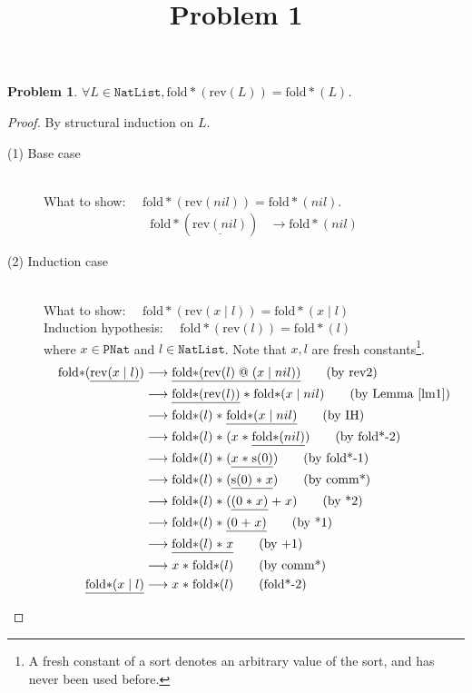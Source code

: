\documentclass[12pt, a4paper]{article}
\title{Problem 1}
\date{\vspace{-5ex}}
\newtheorem{problem}{Problem}
\newcommand{\rel}[1]{\mathrel{#1}}
\newcommand{\rmx}[1]{\mathrm{#1}}
\newcommand{\larrow}{\longrightarrow}
\newcommand{\under}{\underline}
\begin{document}
\maketitle

\begin{problem}
$\forall L \in \mathtt{NatList}, \rmx{fold*}(\rmx{rev}(L)) = \rmx{fold*}(L)$.
\end{problem}
\begin{proof}
By structural induction on $L$.

\begin{description}

\item[(1) Base case]~\\
\noindent
What to show: $\quad\rmx{fold*}(\rmx{rev}(nil)) = \rmx{fold*}(nil)$.
\begin{align*}
\rmx{fold*}(\under{\rmx{rev}(nil)}) &\larrow \rmx{fold*}(nil) \tag{by rev1}
\end{align*}

\item[(2) Induction case]~\\
What to show: $\quad\rmx{fold*}(\rmx{rev}(x \rel{|} l)) = \rmx{fold*}(x \rel{|} l)$\\
Induction hypothesis: $\quad\rmx{fold*}(\rmx{rev}(l)) = \rmx{fold*}(l)$\\
where $x \in \mathtt{PNat}$ and $l \in \mathtt{NatList}$. Note that $x, l$ are fresh constants\footnote{A fresh constant of a sort denotes an arbitrary value of the sort, and has never been used before.}.
\begin{align*}
\rmx{fold*}(\under{\rmx{rev}(x \rel{|} l)}) 
	&\larrow \under{\rmx{fold*}(\rmx{rev}(l)\rel{@}(x \rel{|} nil))} \tag{by rev2} \\
	&\larrow \under{\rmx{fold*}(\rmx{rev}(l))} \rel{*} \rmx{fold*}(x \rel{|} nil) \tag{by Lemma~\ref{lm1}} \\
	&\larrow \rmx{fold*}(l) \rel{*} \under{\rmx{fold*}(x \rel{|} nil)} \tag{by IH} \\
	&\larrow \rmx{fold*}(l) \rel{*} (x \rel{*} \under{\rmx{fold*}(nil)}) \tag{by fold*-2} \\
	&\larrow \rmx{fold*}(l) \rel{*} (\under{x \rel{*} \rmx{s}(0)}) \tag{by fold*-1} \\
	&\larrow \rmx{fold*}(l) \rel{*} (\under{\rmx{s}(0) \rel{*} x}) \tag{by comm*} \\
	&\larrow \rmx{fold*}(l) \rel{*} (\under{(0 \rel{*} x)} \rel{+} x) \tag{by *2} \\
	&\larrow \rmx{fold*}(l) \rel{*} \under{(0 \rel{+} x)} \tag{by *1} \\
	&\larrow \under{\rmx{fold*}(l) \rel{*} x} \tag{by +1} \\
	&\larrow x \rel{*} \rmx{fold*}(l) \tag{by comm*} \\
\under{\rmx{fold*}(x \rel{|} l)} 
	&\larrow x \rel{*} \rmx{fold*}(l) \tag{fold*-2}
\end{align*}

\end{description}
\end{proof}
\end{document}
